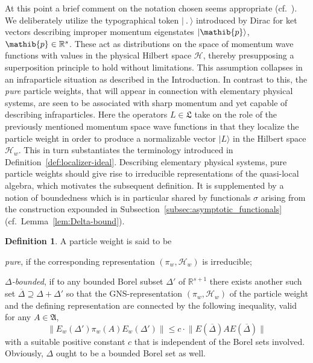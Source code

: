 \documentclass[a4paper,a4paper]{article}
\numberwithin{equation}{section}
\newcommand{\Afrak}{\mathfrak{A}}
\newcommand{\Lfrak}{\mathfrak{L}}
\newcommand{\pib}{\mathib{p}}
\newcommand{\Hscr}{\mathscr{H}}
\newcommand{\Rs}{\mathbb{R}^s}
\newcommand{\Rsone}{\mathbb{R}^{s + 1}}
\newcommand{\Deltabar}{\overline{\Delta}}
\newcommand{\EDbar}{E ( \overline{\Delta} )}
\newcommand{\EwDprime}{E_w ( \Delta' )}
\newcounter{defitem}
\newenvironment{deflist}{\begin{list}{(\alph{defitem})}%
  {\usecounter{defitem} \setlength{\topsep}{0ex}%
   \setlength{\parsep}{0.2ex} \setlength{\itemsep}{0.4ex}%
   \setlength{\leftmargin}{0em} \setlength{\itemindent}{0.5em}%
   }}{\end{list}}
\theoremstyle{definition}
\newtheorem{definition}{Definition}[section]
\theoremstyle{plain}
\theoremstyle{remark}
\newcommand{\norm}[1]{\lVert #1 \rVert}
\newcommand{\ket}[1]{\vert #1 \rangle}
\begin{document}
  At this point a brief comment on the notation chosen seems
  appropriate (cf.~\cite{buchholz/porrmann/stein:1991}). We
  deliberately utilize the typographical token $\ket{~.~}$ introduced
  by Dirac \label{page:dirac-kets} \cite[\S\,23]{dirac:1958} for ket
  vectors describing improper momentum eigenstates $\ket{\pib}$, $\pib
  \in \Rs$. These act as distributions on the space of momentum wave
  functions with values in the physical Hilbert space $\Hscr$, thereby
  presupposing a superposition principle to hold without limitations.
  This assumption collapses in an infraparticle situation as described
  in the Introduction. In contrast to this, the \emph{pure} particle
  weights, that will appear in connection with elementary physical
  systems, are seen to be associated with sharp momentum and yet
  capable of describing infraparticles. Here the operators $L \in
  \Lfrak$ take on the role of the previously mentioned momentum space
  wave functions in that they localize the particle weight in order to
  produce a normalizable vector $\ket{L}$ in the Hilbert space
  $\Hscr_w$. This in turn substantiates the terminology introduced in
  Definition~\ref{def:localizer-ideal}.  Describing elementary
  physical systems, pure particle weights should give rise to
  irreducible representations of the quasi-local algebra, which
  motivates the subsequent definition. It is supplemented by a notion
  of boundedness which is in particular shared by functionals $\sigma$
  arising from the construction expounded in
  Subsection~\ref{subsec:asymptotic_functionals}
  (cf.~Lemma~\ref{lem:Delta-bound}).
  \begin{definition}
    \label{def:weight-classification}
    A particle weight is said to be
    \begin{deflist}
    \item \emph{pure}, if the corresponding representation $( \pi_w ,
      \Hscr_w )$ is irreducible;
    \item \emph{$\Delta$-bounded}, if to any bounded Borel subset
      $\Delta'$ of $\Rsone$ there exists another such set $\Deltabar
      \supseteq \Delta + \Delta'$ so that the GNS-representation $(
      \pi_w , \Hscr_w )$ of the particle weight and the defining
      representation are connected by the following inequality,
      valid for any $A \in \Afrak$,
      \begin{equation}
        \label{eq:Delta-boundedness}
        \norm{\EwDprime \pi_w ( A ) \EwDprime} \leqslant c \cdot
        \norm{\EDbar A \EDbar}
      \end{equation}
      with a suitable positive constant $c$ that is independent of the
      Borel sets involved. Obviously, $\Delta$ ought to be a bounded
      Borel set as well.
    \end{deflist}
  \end{definition}
\end{document}
